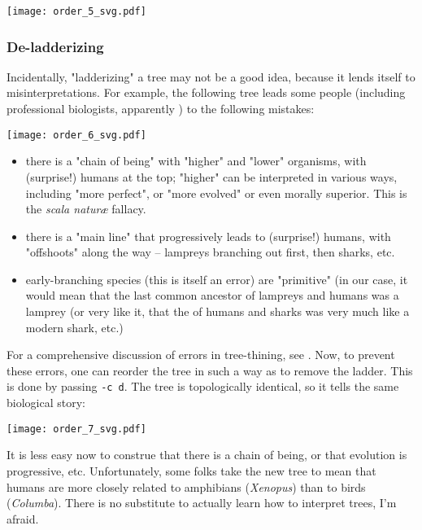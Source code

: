 
\begin{center}
\texttt{[image: order\_5\_svg.pdf]}
\end{center}

\subsubsection{De-ladderizing}

Incidentally, "ladderizing" a tree may not be a good idea, because it lends
itself to misinterpretations. For example, the following tree leads some people
(including professional biologists, apparently \cite{Baum_2005}) to the
following mistakes:

\begin{center}
\texttt{[image: order\_6\_svg.pdf]}
\end{center}
\begin{itemize}
	\item there is a "chain of being" with "higher" and "lower" organisms, with (surprise!) humans at the top; "higher" can be interpreted in various ways, including "more perfect", or "more evolved" or even morally superior. This is the \textit{scala natur\ae} fallacy.
	\item there is a "main line" that progressively leads to (surprise!) humans, with "offshoots" along the way -- lampreys branching out first, then sharks, etc. 
	\item early-branching species (this is itself an error) are "primitive" (in our case, it would mean that the last common ancestor of lampreys and humans was a lamprey (or very like it, that the \lca{} of humans and sharks was very much like a modern shark, etc.)
\end{itemize}
For a comprehensive discussion of errors in tree-thining, see
\cite{Gregory_2008}.  Now, to prevent these errors, one can reorder the tree in
such a way as to remove the ladder. This is done by passing \texttt{-c d}. The
tree is topologically identical, so it tells the same biological story:


\begin{center}
\texttt{[image: order\_7\_svg.pdf]}
\end{center}

\noindent{}It is less easy now to construe that there is a chain of being, or that evolution is progressive, etc. Unfortunately, some folks take the new tree to mean that humans are more closely related to amphibians (\textit{Xenopus}) than to birds (\textit{Columba}). There is no substitute to actually learn how to interpret trees, I'm afraid. 
